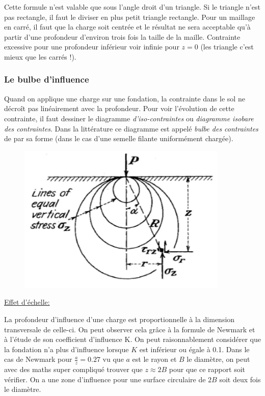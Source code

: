             Cette formule n'est valable que sous l'angle droit d'un triangle. Si le triangle n'est pas rectangle, il faut le diviser en plus petit triangle rectangle. Pour un maillage en carré, il faut que la charge soit centrée et le résultat ne sera acceptable qu'à partir d'une profondeur d'environ trois fois la taille de la maille. Contrainte excessive pour une profondeur inférieur voir infinie pour $z=0$ (les triangle c'est mieux que les carrés !).
            
            \subsubsection{Le bulbe d'influence}
            
            Quand on applique une charge sur une fondation, la contrainte dans le sol ne décroît pas linéairement avec la profondeur. Pour voir l'évolution de cette contrainte, il faut dessiner le diagramme \textit{d'iso-contraintes} ou \textit{diagramme isobare des contraintes}. Dans la littérature ce diagramme est appelé \textit{bulbe des contraintes} de par sa forme (dans le cas d'une semelle filante uniformément chargée).
            
            \begin{figure}[h!]
                \centering
                \includegraphics[scale=0.8]{Holeyman/images/H30.PNG}
            \end{figure}
             
            \underline{Effet d'échelle: } 
            
            La profondeur d'influence d'une charge est proportionnelle à la dimension transversale de celle-ci. On peut observer cela grâce à la formule de Newmark et à l'étude de son coefficient d'influence K. On peut raisonnablement considérer que la fondation n'a plus d'influence lorsque $K$ est inférieur ou égale à 0.1. Dans le cas de Newmark pour $\frac{a}{z} = 0.27$ vu que  $a$ est le rayon et $B$ le diamètre, on peut avec des maths super compliqué trouver que $z \approx 2B$ pour que ce rapport soit vérifier. On a une zone d'influence pour une surface circulaire de $2B$ soit deux fois le diamètre.
            
